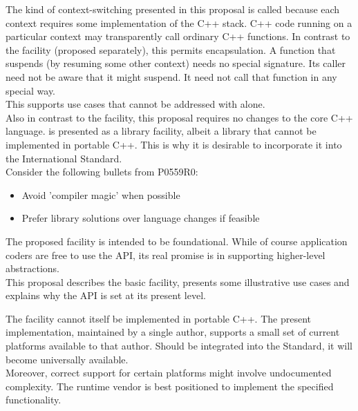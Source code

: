 \documentclass[fontsize=10pt,paper=A4,pagesize,DIV=15]{scrartcl}
\begin{document}
The kind of context-switching presented in this proposal is called
 because each context requires some implementation of the C++
stack. C++ code running on a particular context may transparently call
ordinary C++ functions. In contrast to the \bfs{\coawait}
facility (proposed separately\cite{N4649}), this permits encapsulation. A
function that suspends (by resuming some other context) needs no special
signature. Its caller need not be aware that it might suspend. It need not
call that function in any special way.\\

This supports use cases that cannot be addressed with \coawait alone.\\

Also in contrast to the \coawait facility, this proposal requires no
changes to the core C++ language. \cc is presented as a library facility,
albeit a library that cannot be implemented in portable C++. This is why it is
desirable to incorporate it into the International Standard.\\

Consider the following bullets from P0559R0:\cite{P0559R0}

\begin{itemize}
\item Avoid 'compiler magic' when possible
\item Prefer library solutions over language changes if feasible
\end{itemize}

The proposed \cc facility is intended to be foundational. While of course
application coders are free to use the \cc API, its real promise is in
supporting higher-level abstractions.\\

This proposal describes the basic \cc facility, presents some illustrative use
cases and explains why the API is set at its present level.


The \cc facility cannot itself be implemented in portable C++. The present
implementation,\cite{bcontext} maintained by a single author, supports a
small set of current platforms available to that author. Should \cc be
integrated into the Standard, it will become universally available.\\

Moreover, correct support for certain platforms might involve undocumented
complexity. The runtime vendor is best positioned to implement the specified
functionality.\\
\end{document}
